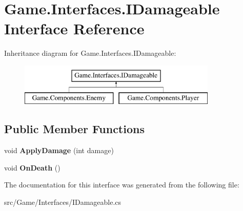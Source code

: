 \hypertarget{interface_game_1_1_interfaces_1_1_i_damageable}{}\section{Game.\+Interfaces.\+I\+Damageable Interface Reference}
\label{interface_game_1_1_interfaces_1_1_i_damageable}
Inheritance diagram for Game.\+Interfaces.\+I\+Damageable\+:\begin{figure}[H]
\begin{center}
\leavevmode
\includegraphics[height=2.000000cm]{interface_game_1_1_interfaces_1_1_i_damageable}
\end{center}
\end{figure}
\subsection*{Public Member Functions}
\begin{DoxyCompactItemize}
\item 
\mbox{\label{interface_game_1_1_interfaces_1_1_i_damageable_a29371d7fde6f0536946a48ca48ea82c4}} 
void {\bfseries Apply\+Damage} (int damage)
\item 
\mbox{\label{interface_game_1_1_interfaces_1_1_i_damageable_a6df7fc5928a7ecad3ea5bf323d98cf00}} 
void {\bfseries On\+Death} ()
\end{DoxyCompactItemize}


The documentation for this interface was generated from the following file\+:\begin{DoxyCompactItemize}
\item 
src/\+Game/\+Interfaces/I\+Damageable.\+cs\end{DoxyCompactItemize}

